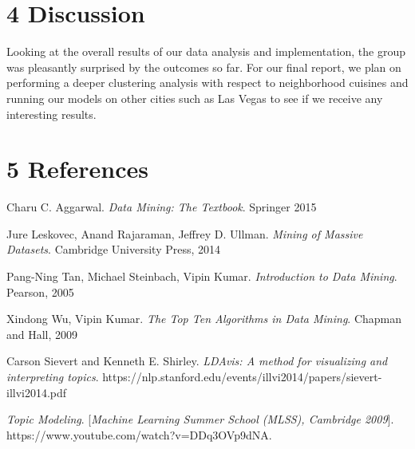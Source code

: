 \documentclass{neu_handout}
\begin{document}
\section*{4 Discussion}

Looking at the overall results of our data analysis and implementation, the group was pleasantly surprised by the outcomes so far. For our final report, we plan on performing a deeper clustering analysis with respect to neighborhood cuisines and running our models on other cities such as Las Vegas to see if we receive any interesting results. 


\section*{5 References}

\begin{thebibliography}{9}

Charu C. Aggarwal. 
\textit{Data Mining: The Textbook}. 
Springer 2015

Jure Leskovec, Anand Rajaraman, Jeffrey D. Ullman. 
\textit{Mining of Massive Datasets}. 
Cambridge University Press, 2014

Pang-Ning Tan, Michael Steinbach, Vipin Kumar. 
\textit{Introduction to Data Mining}. 
Pearson, 2005

Xindong Wu, Vipin Kumar.
\textit{The Top Ten Algorithms in Data Mining}. 
Chapman and Hall, 2009

Carson Sievert and Kenneth E. Shirley. 
\textit{LDAvis: A method for visualizing and interpreting topics}. 
https://nlp.stanford.edu/events/illvi2014/papers/sievert-illvi2014.pdf
 
\textit{Topic Modeling}.
[\textit{Machine Learning Summer School (MLSS), Cambridge 2009}]. 
https://www.youtube.com/watch?v=DDq3OVp9dNA.
 

\end{thebibliography}
\end{document}
